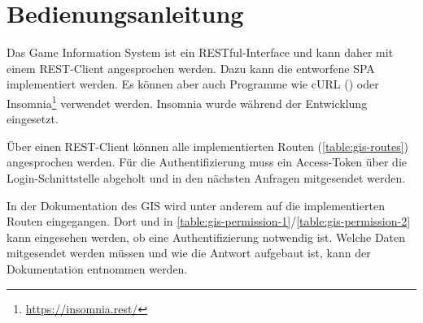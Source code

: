 \section{Bedienungsanleitung}

Das Game Information System ist ein RESTful-Interface und kann daher mit einem REST-Client angesprochen werden. Dazu kann die entworfene SPA implementiert werden. \linebreak Es können aber auch Programme wie cURL () oder Insomnia\footnote{\url{https://insomnia.rest/}} verwendet werden. Insomnia wurde während der Entwicklung eingesetzt.

Über einen REST-Client können alle implementierten Routen (\autoref{table:gis-routes}) angesprochen \linebreak werden. Für die Authentifizierung muss ein Access-Token über die Login-Schnittstelle \linebreak abgeholt und in den nächsten Anfragen mitgesendet werden.

In der Dokumentation des GIS wird unter anderem auf die implementierten Routen eingegangen. Dort und in \autoref{table:gis-permission-1}/\ref{table:gis-permission-2} kann eingesehen werden, ob eine Authentifizierung notwendig ist. Welche Daten mitgesendet werden müssen und wie die Antwort aufgebaut ist, kann der Dokumentation entnommen werden.